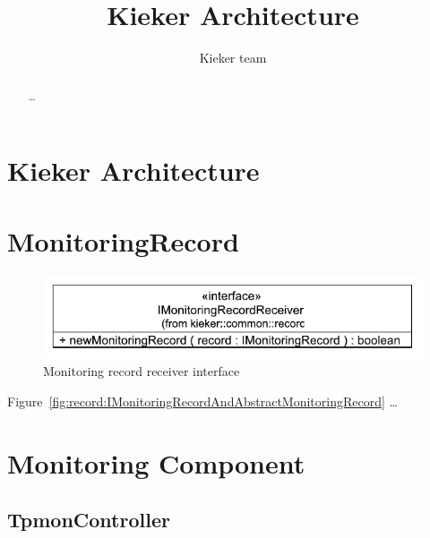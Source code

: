 \documentclass[12pt,journal,a4paper,twocolumn,final,oneside]{IEEEtran}%
\begin{document}
%

\setcounter{page}{1}

\title{%
Kieker Architecture%
}

\author{%
Kieker team
}

\maketitle

\begin{abstract}\small
\ldots
\end{abstract}

\section{Kieker Architecture} 



\section{MonitoringRecord}


\begin{figure}[h]\centering
\includegraphics[scale=0.65]{figures/model/kieker_IMonitoringRecordReceiver}%
\caption{Monitoring record receiver interface}
\label{fig:record:IMonitoringRecordReceiver}
\end{figure}


Figure~\ref{fig:record:IMonitoringRecordAndAbstractMonitoringRecord} \dots

\section{Monitoring Component}

\subsection{TpmonController}
\end{document}

